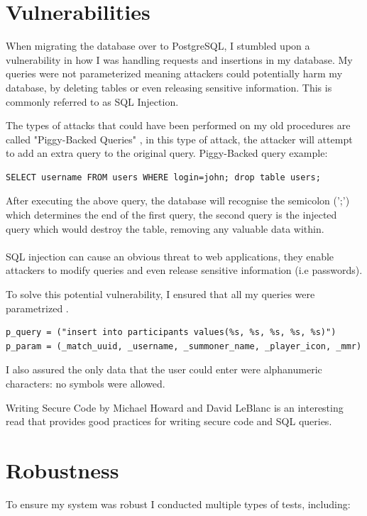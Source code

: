 \section{Vulnerabilities}
When migrating the database over to PostgreSQL, I stumbled upon a vulnerability in how I was handling requests and insertions in my database. My queries were not parameterized meaning attackers could potentially harm my database, by deleting tables or even releasing sensitive information. This is commonly referred to as SQL Injection. 

The types of attacks that could have been performed on my old procedures are called "Piggy-Backed Queries" \cite{halfond2006classification}, in this type of attack, the attacker will attempt to add an extra query to the original query. 
\newline Piggy-Backed query example:

\begin{verbatim}
SELECT username FROM users WHERE login=john; drop table users;
\end{verbatim}

After executing the above query, the database will recognise the semicolon (';') which determines the end of the first query, the second query is the injected query which would destroy the table, removing any valuable data within.

\paragraph{}
SQL injection \cite{halfond2006classification} can cause an obvious threat to web applications, they enable attackers to modify queries and even release sensitive information (i.e passwords).

To solve this potential vulnerability, I ensured that all my queries were parametrized \cite{psycopg}.
\begin{verbatim}
p_query = ("insert into participants values(%s, %s, %s, %s, %s)")
p_param = (_match_uuid, _username, _summoner_name, _player_icon, _mmr)
\end{verbatim}
I also assured the only data that the user could enter were alphanumeric characters: no symbols were allowed.

Writing Secure Code\cite{howard2003writing} by Michael Howard and David LeBlanc is an interesting read that provides good practices for writing secure code and SQL queries.

\section{Robustness}
To ensure my system was robust I conducted multiple types of tests, including:

